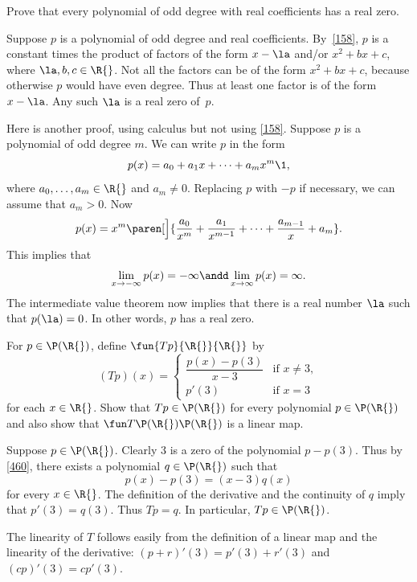 \exercise
Prove that every polynomial of odd degree with real coefficients has a real zero.\label{4oddzero}

\begin{Solution}
Suppose $p$ is a polynomial of odd degree and real coefficients.
By~\ref{158}, $p$ is a constant times the product of factors of the form $x - \la$
and/or $x^2 + b x + c$, where $\la, b, c \in \R{}$.  Not all the
factors can be of the form $x^2 + b x + c$, because otherwise $p$ would
have even degree.  Thus at least one factor is of the form $x - \la$.  Any
such $\la$ is a real zero of~$p$.

\Comment
Here is another proof, using calculus but not using \ref{158}.  Suppose $p$ is a
polynomial of odd degree $m$.  We can write $p$ in the form
\[
p(x) = a_0 + a_1 x + \dots + a_m x^m\1,
\]
where $a_0, \dots, a_m \in \R{}$ and $a_m \ne 0$.  Replacing $p$ with $-p$ if
necessary, we can assume that $a_m > 0$.  Now
\[
p(x) = x^m \paren[\Big]{\frac{a_0}{x^m} + \frac{a_1}{x^{m-1}} + \dots
+ \frac{a_{m-1}}{x} + a_m}.
\]
This implies that
\[
\lim_{x \to -\infty} p(x) = -\infty \andd \lim_{x \to \infty} p(x) = \infty.
\]
The intermediate value theorem now implies that there is a real number $\la$ such
that $p(\la) = 0$.  In other words, $p$ has a real zero.
\end{Solution}

\exercise
For $p \in \P(\R{})$, define $\fun {Tp} {\R{}} {\R{}}$ by
\[
(Tp)(x) =
\begin{cases}
\dfrac{p(x) - p(3)}{x-3} & \text{if } x \ne 3,\\[9bp]
p' \! (3) & \text{if } x = 3
\end{cases}
\]
for each $x \in \R{}$. Show that $Tp \in \P(\R{})$ for every polynomial $p \in \P(\R{})$ and also show that $\fun T {\P(\R{})} {\P(\R{})}$ is a linear map.

\begin{Solution}
Suppose $p \in \P(\R{})$. Clearly $3$ is a zero of the polynomial $p - p(3)$. Thus by \ref{460}, there exists a polynomial $q \in \P(\R{})$ such that
\[
p(x) - p(3) = (x - 3) q(x)
\]
for every $x \in \R{}$. The definition of the derivative and the continuity of $q$ imply that $p' \! (3) = q(3)$. Thus $Tp = q$. In particular, $Tp \in \P(\R{})$.

The linearity of $T$ follows easily from the definition of a linear map and the linearity of the derivative: $(p + r)' \! (3) = p' \! (3) + r' \! (3)$ and $(cp)' \! (3) = c p' \! (3)$.
\end{Solution}

